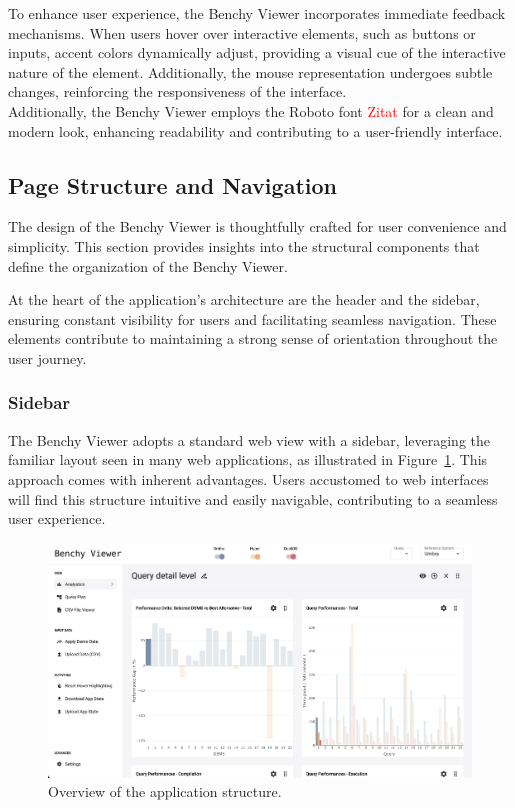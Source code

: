 To enhance user experience, the Benchy Viewer incorporates immediate feedback mechanisms. When users hover over interactive elements, such as buttons or inputs, accent colors dynamically adjust, providing a visual cue of the interactive nature of the element. Additionally, the mouse representation undergoes subtle changes, reinforcing the responsiveness of the interface.\\
Additionally, the Benchy Viewer employs the Roboto font \textcolor{red}{Zitat} for a clean and modern look, enhancing readability and contributing to a user-friendly interface.


\subsection{Page Structure and Navigation}\label{sec:page-structure}

The design of the Benchy Viewer is thoughtfully crafted for user convenience and simplicity. This section provides insights into the structural components that define the organization of the Benchy Viewer.

At the heart of the application's architecture are the header and the sidebar, ensuring constant visibility for users and facilitating seamless navigation. These elements contribute to maintaining a strong sense of orientation throughout the user journey.


\subsubsection{Sidebar}

The Benchy Viewer adopts a standard web view with a sidebar, leveraging the familiar layout seen in many web applications, as illustrated in Figure~\ref{fig:app}. This approach comes with inherent advantages. Users accustomed to web interfaces will find this structure intuitive and easily navigable, contributing to a seamless user experience.

\begin{figure}[h]
  \centering
  \includegraphics[width=1\linewidth]{figures/app.png}
  \caption{Overview of the application structure.}
  \label{fig:app}
\end{figure}

